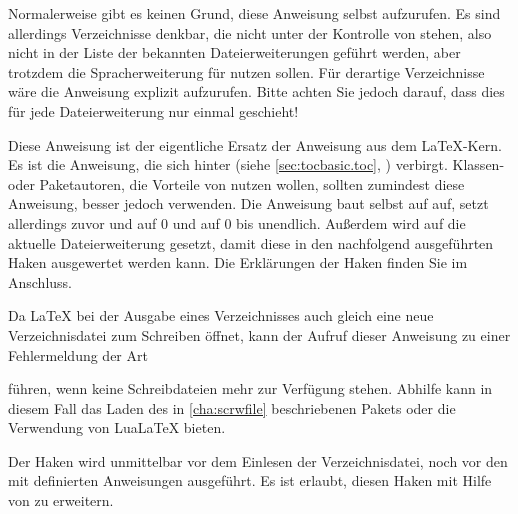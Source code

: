 Normalerweise gibt es keinen Grund, diese Anweisung selbst aufzurufen. Es sind
allerdings Verzeichnisse denkbar, die nicht unter der Kontrolle von
 stehen, also nicht in der Liste der bekannten
Dateierweiterungen geführt werden, aber trotzdem die Spracherweiterung für
 nutzen sollen. Für derartige Verzeichnisse wäre die Anweisung
explizit aufzurufen. Bitte achten Sie jedoch darauf, dass
dies für jede Dateierweiterung nur einmal geschieht!%
\EndIndexGroup


\begin{Declaration}
\end{Declaration}
Diese Anweisung ist der eigentliche Ersatz der Anweisung
 aus dem
\LaTeX-Kern. Es ist die Anweisung, die sich hinter
 (siehe \autoref{sec:tocbasic.toc},
) verbirgt. Klassen- oder Paketautoren,
die Vorteile von  nutzen wollen, sollten zumindest diese
Anweisung, besser jedoch  verwenden. Die
Anweisung baut selbst auf  auf, setzt allerdings zuvor
 und
 auf 0 und
 auf 0 bis unendlich. Außerdem
wird  auf die
aktuelle Dateierweiterung gesetzt, damit diese in den nachfolgend ausgeführten
Haken ausgewertet werden kann. Die Erklärungen der Haken finden
Sie im Anschluss.

Da \LaTeX{} bei der Ausgabe eines Verzeichnisses auch
gleich eine neue Verzeichnisdatei zum Schreiben öffnet, kann der Aufruf dieser
Anweisung zu einer Fehlermeldung der Art
führen, wenn keine Schreibdateien mehr zur Verfügung stehen. Abhilfe kann in
diesem Fall das Laden des in \autoref{cha:scrwfile} beschriebenen Pakets
oder die Verwendung von Lua\LaTeX{} bieten.%
\EndIndexGroup


\begin{Declaration}
\end{Declaration}
Der Haken  wird unmittelbar vor dem
Einlesen der Verzeichnisdatei, noch vor den mit
 definierten Anweisungen
ausgeführt. Es ist erlaubt, diesen Haken mit Hilfe von
 zu erweitern.

